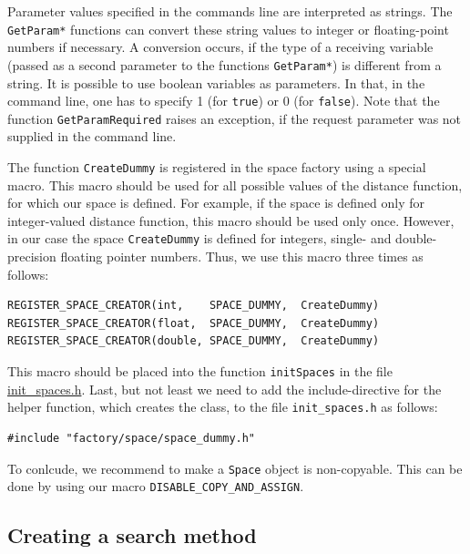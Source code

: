 \documentclass[runningheads,a4paper]{llncs}
\newcommand{\replocfile}{https://github.com/searchivarius/NonMetricSpaceLib/blob/pserv/}
\newcommand{\ttt}[1]{\texttt{#1}}
\begin{document}
Parameter values specified in the commands line are interpreted as strings.
The \ttt{GetParam*} functions can convert these string values
to integer or floating-point numbers if necessary.
A conversion occurs, if the type of a receiving variable (passed as a second parameter
to the functions \ttt{GetParam*}) is different from a string.
It is possible to use boolean variables as parameters.
In that, in the command line, one has to specify 1 (for \ttt{true}) or 0 (for \ttt{false}).
Note that the function \ttt{GetParamRequired} raises an exception, 
if the request parameter was not supplied in the command line.

The function \ttt{CreateDummy} is registered in the space factory using a special macro.
This macro should be used for all possible values of the distance function,
for which our space is defined. For example, if the space is defined
only for integer-valued distance function, this macro should be used only once.
However, in our case the space \ttt{CreateDummy} is defined for integers,
single- and double-precision floating pointer numbers. Thus, we use this macro
three times as follows:
\begin{verbatim}
REGISTER_SPACE_CREATOR(int,    SPACE_DUMMY,  CreateDummy)
REGISTER_SPACE_CREATOR(float,  SPACE_DUMMY,  CreateDummy)
REGISTER_SPACE_CREATOR(double, SPACE_DUMMY,  CreateDummy)
\end{verbatim}

This macro should be placed into the function \ttt{initSpaces} in the 
file 
\href{\replocfile similarity_search/include/factory/init\_spaces.h}{init\_spaces.h}.
Last, but not least we need to add the include-directive
for the helper function, which creates
the class, to the file \ttt{init\_spaces.h} as follows:
\begin{verbatim}
#include "factory/space/space_dummy.h"
\end{verbatim}

To conlcude, we recommend to make a \ttt{Space} object is non-copyable. 
This can be done by using our macro \ttt{DISABLE\_COPY\_AND\_ASSIGN}.


\subsection{Creating a search method}\label{SectionCreateMethod}
\end{document}
